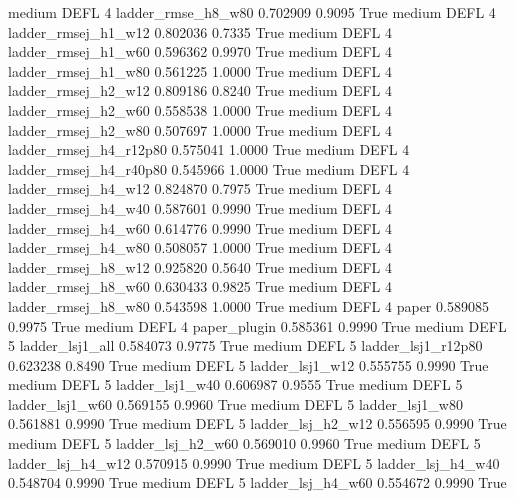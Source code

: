     medium     DEFL                 4     ladder_rmse_h8_w80   0.702909      0.9095    True
    medium     DEFL                 4    ladder_rmsej_h1_w12   0.802036      0.7335    True
    medium     DEFL                 4    ladder_rmsej_h1_w60   0.596362      0.9970    True
    medium     DEFL                 4    ladder_rmsej_h1_w80   0.561225      1.0000    True
    medium     DEFL                 4    ladder_rmsej_h2_w12   0.809186      0.8240    True
    medium     DEFL                 4    ladder_rmsej_h2_w60   0.558538      1.0000    True
    medium     DEFL                 4    ladder_rmsej_h2_w80   0.507697      1.0000    True
    medium     DEFL                 4 ladder_rmsej_h4_r12p80   0.575041      1.0000    True
    medium     DEFL                 4 ladder_rmsej_h4_r40p80   0.545966      1.0000    True
    medium     DEFL                 4    ladder_rmsej_h4_w12   0.824870      0.7975    True
    medium     DEFL                 4    ladder_rmsej_h4_w40   0.587601      0.9990    True
    medium     DEFL                 4    ladder_rmsej_h4_w60   0.614776      0.9990    True
    medium     DEFL                 4    ladder_rmsej_h4_w80   0.508057      1.0000    True
    medium     DEFL                 4    ladder_rmsej_h8_w12   0.925820      0.5640    True
    medium     DEFL                 4    ladder_rmsej_h8_w60   0.630433      0.9825    True
    medium     DEFL                 4    ladder_rmsej_h8_w80   0.543598      1.0000    True
    medium     DEFL                 4                  paper   0.589085      0.9975    True
    medium     DEFL                 4           paper_plugin   0.585361      0.9990    True
    medium     DEFL                 5        ladder_lsj1_all   0.584073      0.9775    True
    medium     DEFL                 5     ladder_lsj1_r12p80   0.623238      0.8490    True
    medium     DEFL                 5        ladder_lsj1_w12   0.555755      0.9990    True
    medium     DEFL                 5        ladder_lsj1_w40   0.606987      0.9555    True
    medium     DEFL                 5        ladder_lsj1_w60   0.569155      0.9960    True
    medium     DEFL                 5        ladder_lsj1_w80   0.561881      0.9990    True
    medium     DEFL                 5      ladder_lsj_h2_w12   0.556595      0.9990    True
    medium     DEFL                 5      ladder_lsj_h2_w60   0.569010      0.9960    True
    medium     DEFL                 5      ladder_lsj_h4_w12   0.570915      0.9990    True
    medium     DEFL                 5      ladder_lsj_h4_w40   0.548704      0.9990    True
    medium     DEFL                 5      ladder_lsj_h4_w60   0.554672      0.9990    True

